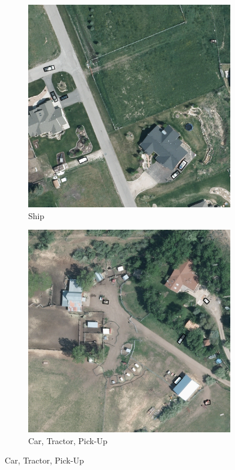\begin{figure}[h!]
    \begin{subfigure}[t]{0.38\textwidth}
        \centering
        \includegraphics[width=\linewidth]{images/015Results/01abb_vs_obb/comp_images/ground_truth_obb/509.png}
        \caption{Ship}
    \end{subfigure}
    \begin{subfigure}[t]{0.38\textwidth}
        \centering
        \includegraphics[width=\linewidth]{images/015Results/01abb_vs_obb/comp_images/ground_truth_obb/523.png}
        \caption{Car, Tractor, Pick-Up}
    \end{subfigure}
    

\end{figure}
